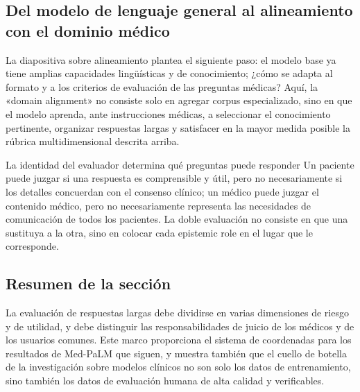 \subsection{Del modelo de lenguaje general al alineamiento con el dominio médico}

La diapositiva sobre alineamiento plantea el siguiente paso: el modelo base ya tiene amplias capacidades lingüísticas y de conocimiento; ¿cómo se adapta al formato y a los criterios de evaluación de las preguntas médicas? Aquí, la «domain alignment» no consiste solo en agregar corpus especializado, sino en que el modelo aprenda, ante instrucciones médicas, a seleccionar el conocimiento pertinente, organizar respuestas largas y satisfacer en la mayor medida posible la rúbrica multidimensional descrita arriba.



\begin{warningbox}{La identidad del evaluador determina qué preguntas puede responder}
Un paciente puede juzgar si una respuesta es comprensible y útil, pero no necesariamente si los detalles concuerdan con el consenso clínico; un médico puede juzgar el contenido médico, pero no necesariamente representa las necesidades de comunicación de todos los pacientes. La doble evaluación no consiste en que una sustituya a la otra, sino en colocar cada epistemic role en el lugar que le corresponde.
\end{warningbox}

\subsection{Resumen de la sección}

La evaluación de respuestas largas debe dividirse en varias dimensiones de riesgo y de utilidad, y debe distinguir las responsabilidades de juicio de los médicos y de los usuarios comunes. Este marco proporciona el sistema de coordenadas para los resultados de Med-PaLM que siguen, y muestra también que el cuello de botella de la investigación sobre modelos clínicos no son solo los datos de entrenamiento, sino también los datos de evaluación humana de alta calidad y verificables.
